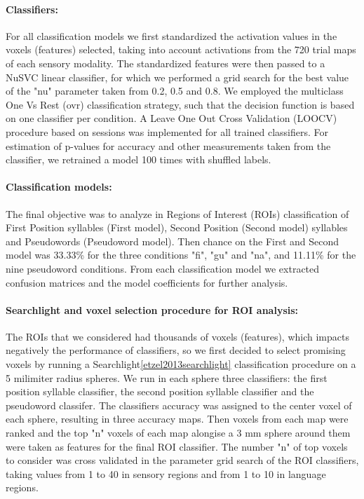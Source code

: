 \paragraph{Classifiers:}
For all classification models we first standardized the activation values in the voxels (features) selected, taking into account activations from the 720 trial maps of each sensory modality.
The standardized features were then passed to a NuSVC linear classifier, for which we performed a grid search for the best value of the "nu" parameter taken from 0.2, 0.5 and 0.8.
We employed the multiclass One Vs Rest (ovr) classification strategy, such that the decision function is based on one classifier per condition.
A Leave One Out Cross Validation (LOOCV) procedure based on sessions was implemented for all trained classifiers.
For estimation of p-values for accuracy and other measurements taken from the classifier, we retrained a model 100 times with shuffled labels.


\paragraph{Classification models:}
The final objective was to analyze in Regions of Interest (ROIs) classification of First Position syllables (First model), Second Position (Second model) syllables and Pseudowords (Pseudoword model).
Then chance on the First and Second model was 33.33\% for the three conditions "fi", "gu" and "na", and 11.11\% for the nine pseudoword conditions.
From each classification model we extracted confusion matrices and the model coefficients for further analysis.

\paragraph{Searchlight and voxel selection procedure for ROI analysis:}
The ROIs that we considered had thousands of voxels (features), which impacts negatively the performance of classifiers, so we first decided to select promising voxels by running a Searchlight\ref{etzel2013searchlight} classification procedure on a 5 milimiter radius spheres.
We run in each sphere three classifiers: the first position syllable classifier, the second position syllable classifier and the pseudoword classifer.
The classifiers accuracy was assigned to the center voxel of each sphere, resulting in three accuracy maps.
Then voxels from each map were ranked and the top "n" voxels of each map alongise a 3 mm sphere around them were taken as features for the final ROI classifier.
The number "n" of top voxels to consider was cross validated in the parameter grid search of the ROI classifiers, taking values from 1 to 40 in sensory regions and from 1 to 10 in language regions.

